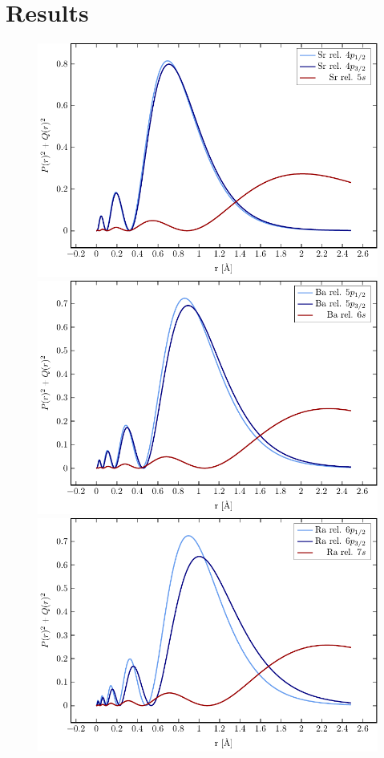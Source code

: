 \section{Results}

\begin{figure}[h]
 \centering
 \includegraphics[width=\columnwidth]{pics/sr_R.pdf}\\
 \includegraphics[width=\columnwidth]{pics/ba_R.pdf}\\
 \includegraphics[width=\columnwidth]{pics/ra_R.pdf}\\
 \caption{}
 \label{fig:radial}
\end{figure}
